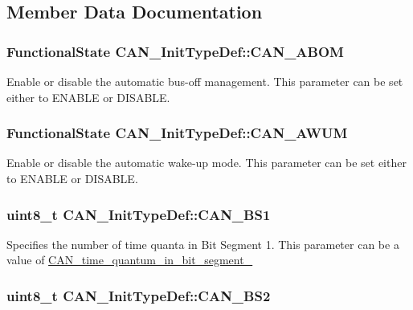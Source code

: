 \subsection{Member Data Documentation}
\hypertarget{structCAN__InitTypeDef_a70560646c27d96ca8adc4a62d24dafd9}{
\subsubsection[{CAN\_\-ABOM}]{\setlength{\rightskip}{0pt plus 5cm}FunctionalState {\bf CAN\_\-InitTypeDef::CAN\_\-ABOM}}}
\label{structCAN__InitTypeDef_a70560646c27d96ca8adc4a62d24dafd9}
Enable or disable the automatic bus-\/off management. This parameter can be set either to ENABLE or DISABLE. \hypertarget{structCAN__InitTypeDef_a10f873c858a7b0efc2d0ab41524320d3}{
\subsubsection[{CAN\_\-AWUM}]{\setlength{\rightskip}{0pt plus 5cm}FunctionalState {\bf CAN\_\-InitTypeDef::CAN\_\-AWUM}}}
\label{structCAN__InitTypeDef_a10f873c858a7b0efc2d0ab41524320d3}
Enable or disable the automatic wake-\/up mode. This parameter can be set either to ENABLE or DISABLE. \hypertarget{structCAN__InitTypeDef_aecbd21b55dc88c3a18db93af2836cd58}{
\subsubsection[{CAN\_\-BS1}]{\setlength{\rightskip}{0pt plus 5cm}uint8\_\-t {\bf CAN\_\-InitTypeDef::CAN\_\-BS1}}}
\label{structCAN__InitTypeDef_aecbd21b55dc88c3a18db93af2836cd58}
Specifies the number of time quanta in Bit Segment 1. This parameter can be a value of \hyperlink{group__CAN__time__quantum__in__bit__segment__1}{CAN\_\-time\_\-quantum\_\-in\_\-bit\_\-segment\_} \hypertarget{structCAN__InitTypeDef_a693eb00830d6e2aeb4d9fabdba85b9cf}{
\subsubsection[{CAN\_\-BS2}]{\setlength{\rightskip}{0pt plus 5cm}uint8\_\-t {\bf CAN\_\-InitTypeDef::CAN\_\-BS2}}}
